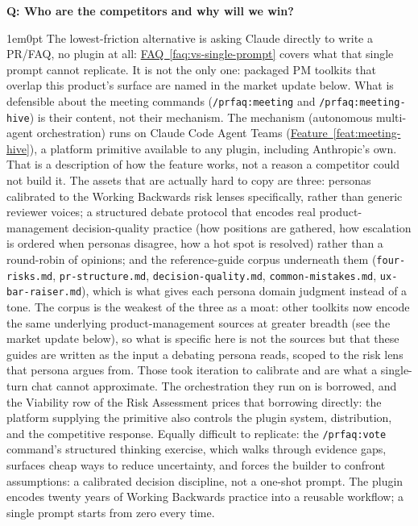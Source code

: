 \documentclass[11pt,letterpaper]{article}
\newcounter{faqnum}
\newenvironment{faqpair}[1]{%
  \needspace{4\baselineskip}%
  \vspace{0.5em}%
  \refstepcounter{faqnum}%
  \noindent\textbf{\color{SectionBlue}Q\thefaqnum: #1}\par\nopagebreak[4]%
  \vspace{0.2em}%
  \begin{adjustwidth}{1em}{0pt}%
  \setlength{\parindent}{0pt}%
}{%
  \end{adjustwidth}%
  \vspace{0.5em}%
}
\newcommand{\faqref}[1]{\hyperref[#1]{FAQ~\ref*{#1}}}
\newcommand{\featureref}[1]{\hyperref[#1]{Feature~\ref*{#1}}}
\begin{document}
\begin{faqpair}{Who are the competitors and why will we win?}\label{faq:competitors}
  The lowest-friction alternative is asking Claude directly to write a PR/FAQ, no plugin at all: \faqref{faq:vs-single-prompt} covers what that single prompt cannot replicate. It is not the only one: packaged PM toolkits that overlap this product's surface are named in the market update below. What is defensible about the meeting commands (\texttt{/prfaq:meeting} and \texttt{/prfaq:meeting-hive}) is their content, not their mechanism. The mechanism (autonomous multi-agent orchestration) runs on Claude Code Agent Teams (\featureref{feat:meeting-hive}), a platform primitive available to any plugin, including Anthropic's own. That is a description of how the feature works, not a reason a competitor could not build it. The assets that are actually hard to copy are three: personas calibrated to the Working Backwards risk lenses specifically, rather than generic reviewer voices; a structured debate protocol that encodes real product-management decision-quality practice (how positions are gathered, how escalation is ordered when personas disagree, how a hot spot is resolved) rather than a round-robin of opinions; and the reference-guide corpus underneath them (\texttt{four-risks.md}, \texttt{pr-structure.md}, \texttt{decision-quality.md}, \texttt{common-mistakes.md}, \texttt{ux-bar-raiser.md}), which is what gives each persona domain judgment instead of a tone. The corpus is the weakest of the three as a moat: other toolkits now encode the same underlying product-management sources at greater breadth (see the market update below), so what is specific here is not the sources but that these guides are written as the input a debating persona reads, scoped to the risk lens that persona argues from. Those took iteration to calibrate and are what a single-turn chat cannot approximate. The orchestration they run on is borrowed, and the Viability row of the Risk Assessment prices that borrowing directly: the platform supplying the primitive also controls the plugin system, distribution, and the competitive response. Equally difficult to replicate: the \texttt{/prfaq:vote} command's structured thinking exercise, which walks through evidence gaps, surfaces cheap ways to reduce uncertainty, and forces the builder to confront assumptions: a calibrated decision discipline, not a one-shot prompt. The plugin encodes twenty years of Working Backwards practice into a reusable workflow; a single prompt starts from zero every time.


\end{faqpair}
\end{document}
